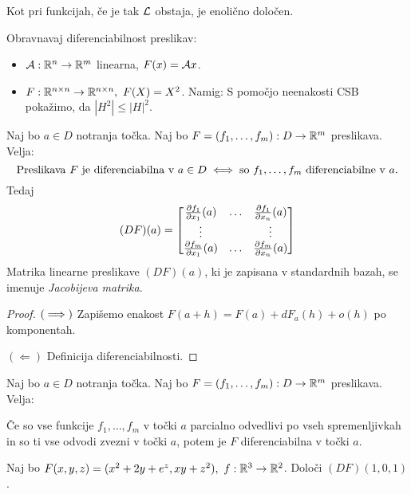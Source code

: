 \begin{opomba}
    Kot pri funkcijah, če je tak $\mathcal{L}$ obstaja, je enolično določen.
\end{opomba}

\begin{zgled}
    Obravnavaj diferenciabilnost preslikav:
    \begin{itemize}
        \item $\mathcal{A}: \mathbb{R}^n \to \mathbb{R}^m$ linearna, $F(x) = \mathcal{A}x$.
        \item $F: \mathbb{R}^{n \times n} \to \mathbb{R}^{n \times n}, \ F(X) = X^2$.         
        Namig: S pomočjo neenakosti CSB pokažimo, da $|H^2| \leq |H|^2$.
    \end{itemize}
\end{zgled}

\begin{izrek}
    Naj bo $a \in D$ notranja točka. Naj bo $F = (f_1, \ldots, f_m): D \to \mathbb{R}^m$ preslikava. Velja: 
    $$\text{Preslikava } F \text{ je diferenciabilna v } a \in D \iff \text{so } f_1, \ldots, f_m \text{ diferenciabilne v } a.$$
    Tedaj
    $$(DF)(a) = \begin{bmatrix}
        \frac{\partial f_1}{\partial x_1}(a) & \ldots & \frac{\partial f_1}{\partial x_n}(a) \\
        \vdots & & \vdots \\
        \frac{\partial f_m}{\partial x_1}(a) & \ldots & \frac{\partial f_m}{\partial x_n}(a) 
    \end{bmatrix}$$
    Matrika linearne preslikave $(DF)(a)$, ki je zapisana v standardnih bazah, se imenuje \emph{Jacobijeva matrika}.
\end{izrek}

\begin{proof}
    $(\implies)$ Zapišemo enakost $F(a+h) = F(a) + dF_a(h) + o(h)$ po komponentah.

    $(\Leftarrow)$ Definicija diferenciabilnosti.
\end{proof}

\begin{posledica}
    Naj bo $a \in D$ notranja točka. Naj bo $F = (f_1, \ldots, f_m): D \to \mathbb{R}^m$ preslikava. Velja:
    
    Če so vse funkcije $f_1, \ldots, f_m$ v točki $a$ parcialno odvedlivi po vseh spremenljivkah in so ti vse odvodi zvezni v točki $a$, potem je $F$ diferenciabilna v točki $a$.
\end{posledica}

\begin{zgled}
    Naj bo $F(x,y,z) = (x^2+2y+e^z, xy+z^2), \ f: \R^3 \to \R^2$. Določi $(DF)(1,0,1)$.
\end{zgled}

